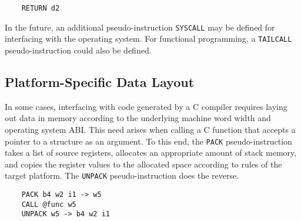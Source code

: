 \begin{verbatim}
    RETURN d2
\end{verbatim}

In the future, an additional pseudo-instruction \texttt{SYSCALL}
may be defined for interfacing with the operating system.
For functional programming, a \texttt{TAILCALL} pseudo-instruction
could also be defined.

\subsection{Platform-Specific Data Layout}

In some cases, interfacing with code generated by a C compiler
requires laying out data in memory according to the
underlying machine word width and operating system ABI.
This need arises when calling a C function that accepts
a pointer to a structure as an argument.
To this end, the \texttt{PACK} pseudo-instruction takes a list
of source registers, allocates an appropriate amount of stack memory,
and copies the register values to the allocated space according
to rules of the target platform. The \texttt{UNPACK} pseudo-instruction
does the reverse.

\begin{verbatim}
    PACK b4 w2 i1 -> w5
    CALL @func w5
    UNPACK w5 -> b4 w2 i1
\end{verbatim}
